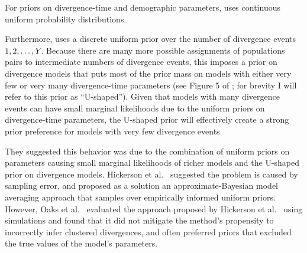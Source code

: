 For priors on divergence-time and demographic parameters, \msb uses continuous
uniform probability distributions.

Furthermore, \msb uses a discrete uniform prior over the number of divergence
events $1,2,\ldots,Y_{}$.
Because there are many more possible assignments of populations pairs to
intermediate numbers of divergence events, this imposes a prior on divergence
models that puts most of the prior mass on models with either very few or very
many divergence-time parameters (see Figure 5 of \cite{Oaks2012}; for brevity
I will refer to this prior as ``U-shaped'').
Given that models with many divergence events can have small marginal
likelihoods due to the uniform priors on divergence-time parameters, the
U-shaped prior will effectively create a strong prior preference for models
with very few divergence events.

They suggested this behavior was due to the combination of uniform priors on
parameters causing small marginal likelihoods of richer models and the
U-shaped prior on divergence models.
Hickerson et al.\ \cite{Hickerson2013} suggested the problem is caused by
sampling error, and proposed as a solution an approximate-Bayesian model
averaging approach that samples over empirically informed uniform priors.
However, Oaks et al.\ \cite{Oaks2014reply} evaluated the approach proposed by
Hickerson et al.\ \cite{Hickerson2013} using simulations and found that it did
not mitigate the method's propensity to incorrectly infer clustered
divergences, and often preferred priors that excluded the true values of the
model's parameters.

